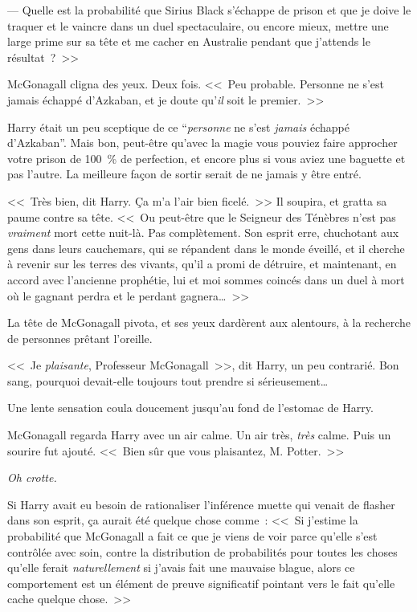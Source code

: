 --- Quelle est la probabilité que Sirius Black s'échappe de prison et que je doive le traquer et le vaincre dans un duel spectaculaire, ou encore mieux, mettre une large prime sur sa tête et me cacher en Australie pendant que j'attends le résultat~?~>>

McGonagall cligna des yeux. Deux fois. <<~Peu probable. Personne ne s'est jamais échappé d'Azkaban, et je doute qu'\emph{il} soit le premier.~>>

Harry était un peu sceptique de ce “\emph{personne} ne s'est \emph{jamais} échappé d'Azkaban”. Mais bon, peut-être qu'avec la magie vous pouviez faire approcher votre prison de 100~\% de perfection, et encore plus si vous aviez une baguette et pas l'autre. La meilleure façon de sortir serait de ne jamais y être entré.

<<~Très bien, dit Harry. Ça m'a l'air bien ficelé.~>> Il soupira, et gratta sa paume contre sa tête. <<~Ou peut-être que le Seigneur des Ténèbres n'est pas \emph{vraiment} mort cette nuit-là. Pas complètement. Son esprit erre, chuchotant aux gens dans leurs cauchemars, qui se répandent dans le monde éveillé, et il cherche à revenir sur les terres des vivants, qu'il a promi de détruire, et maintenant, en accord avec l'ancienne prophétie, lui et moi sommes coincés dans un duel à mort où le gagnant perdra et le perdant gagnera…~>>

La tête de McGonagall pivota, et ses yeux dardèrent aux alentours, à la recherche de personnes prêtant l'oreille.

<<~Je \emph{plaisante}, Professeur McGonagall~>>, dit Harry, un peu contrarié. Bon sang, pourquoi devait-elle toujours tout prendre si sérieusement…

Une lente sensation coula doucement jusqu'au fond de l'estomac de Harry.

McGonagall regarda Harry avec un air calme. Un air très, \emph{très} calme. Puis un sourire fut ajouté. <<~Bien sûr que vous plaisantez, M. Potter.~>>

\emph{Oh crotte.}

Si Harry avait eu besoin de rationaliser l'inférence muette qui venait de flasher dans son esprit, ça aurait été quelque chose comme~: <<~Si j'estime la probabilité que McGonagall a fait ce que je viens de voir parce qu'elle s'est contrôlée avec soin, contre la distribution de probabilités pour toutes les choses qu'elle ferait \emph{naturellement} si j'avais fait une mauvaise blague, alors ce comportement est un élément de preuve significatif pointant vers le fait qu'elle cache quelque chose.~>>

